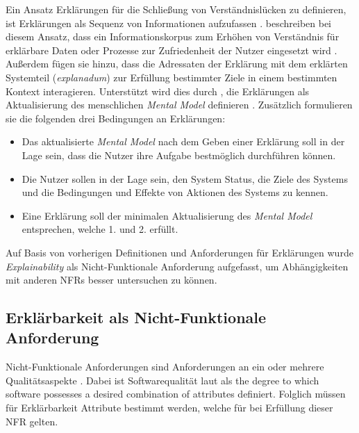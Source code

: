 Ein Ansatz Erklärungen für die Schließung von Verständnislücken zu definieren, ist Erklärungen als Sequenz von Informationen aufzufassen \cite[vgl.][]{wang_integration_2020}. \citeauthor{sovrano_modelling_2020} beschreiben bei diesem Ansatz, dass ein Informationskorpus zum Erhöhen von Verständnis für erklärbare Daten oder Prozesse zur Zufriedenheit der Nutzer eingesetzt wird \cite[übersetzt vgl.][]{sovrano_modelling_2020}. Außerdem fügen sie hinzu, dass die Adressaten der Erklärung mit dem erklärten Systemteil (\textit{explanadum}) zur Erfüllung bestimmter Ziele in einem bestimmten Kontext interagieren. Unterstützt wird dies durch \citeauthor{zahedi_towards_2019}, die Erklärungen als \glqq Aktualisierung des menschlichen \textit{Mental Model}\grqq{} definieren \cite[übersetzt vgl.][]{zahedi_towards_2019}. Zusätzlich formulieren sie die folgenden drei Bedingungen an Erklärungen:
\begin{itemize}
    \item Das aktualisierte \textit{Mental Model} nach dem Geben einer Erklärung soll in der Lage sein, dass die Nutzer ihre Aufgabe bestmöglich durchführen können.
    \item Die Nutzer sollen in der Lage sein, den System Status, die Ziele des Systems und die Bedingungen und Effekte von Aktionen des Systems zu kennen.
    \item Eine Erklärung soll der minimalen Aktualisierung des \textit{Mental Model} entsprechen, welche 1. und 2. erfüllt.
\end{itemize}

Auf Basis von vorherigen Definitionen und Anforderungen für Erklärungen wurde \textit{Explainability} als Nicht-Funktionale Anforderung aufgefasst, um Abhängigkeiten mit anderen NFRs besser untersuchen zu können.

\subsection{Erklärbarkeit als Nicht-Funktionale Anforderung}
\label{02_basics:explainability}

Nicht-Funktionale Anforderungen sind Anforderungen an ein oder mehrere Qualitätsaspekte \cite{chung2009non,schneider2012abenteuer}. Dabei ist Softwarequalität laut  als \glqq [...] the degree to which software possesses a desired combination of attributes\grqq{}\cite{international1992ieee} definiert. Folglich müssen für Erklärbarkeit Attribute bestimmt werden, welche für bei Erfüllung dieser NFR gelten.

